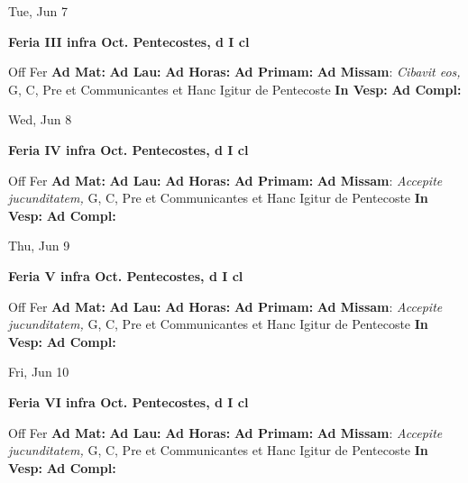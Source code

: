 \documentclass[10pt]{article}
\begin{document}
\begin{minipage}{3.5in}
\vspace{2em}\begin{center}
Tue, Jun 7
\end{center}\textbf{ \large Feria III infra Oct. Pentecostes, \textnormal{\normalsize d I cl}}
\begin{justify}
Off Fer
\textbf{Ad Mat: }
\textbf{Ad Lau: }
\textbf{Ad Horas: }
\textbf{Ad Primam: }
\textbf{Ad Missam}: \textit{Cibavit eos,} G, C, Pre et Communicantes et Hanc Igitur de Pentecoste
\textbf{In Vesp: }
\textbf{Ad Compl: }\end{justify}
\end{minipage}



\begin{minipage}{3.5in}
\vspace{2em}\begin{center}
Wed, Jun 8
\end{center}\textbf{ \large Feria IV infra Oct. Pentecostes, \textnormal{\normalsize d I cl}}
\begin{justify}
Off Fer
\textbf{Ad Mat: }
\textbf{Ad Lau: }
\textbf{Ad Horas: }
\textbf{Ad Primam: }
\textbf{Ad Missam}: \textit{Accepite jucunditatem,} G, C, Pre et Communicantes et Hanc Igitur de Pentecoste
\textbf{In Vesp: }
\textbf{Ad Compl: }\end{justify}
\end{minipage}



\begin{minipage}{3.5in}
\vspace{2em}\begin{center}
Thu, Jun 9
\end{center}\textbf{ \large Feria V infra Oct. Pentecostes, \textnormal{\normalsize d I cl}}
\begin{justify}
Off Fer
\textbf{Ad Mat: }
\textbf{Ad Lau: }
\textbf{Ad Horas: }
\textbf{Ad Primam: }
\textbf{Ad Missam}: \textit{Accepite jucunditatem,} G, C, Pre et Communicantes et Hanc Igitur de Pentecoste
\textbf{In Vesp: }
\textbf{Ad Compl: }\end{justify}
\end{minipage}



\begin{minipage}{3.5in}
\vspace{2em}\begin{center}
Fri, Jun 10
\end{center}\textbf{ \large Feria VI infra Oct. Pentecostes, \textnormal{\normalsize d I cl}}
\begin{justify}
Off Fer
\textbf{Ad Mat: }
\textbf{Ad Lau: }
\textbf{Ad Horas: }
\textbf{Ad Primam: }
\textbf{Ad Missam}: \textit{Accepite jucunditatem,} G, C, Pre et Communicantes et Hanc Igitur de Pentecoste
\textbf{In Vesp: }
\textbf{Ad Compl: }\end{justify}
\end{minipage}
\end{document}
